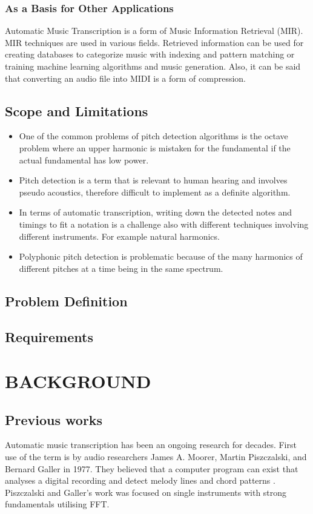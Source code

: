 \documentclass[a4paper,12pt]{report}
\begin{document}
\subsection{As a Basis for Other Applications}
Automatic Music Transcription is a form of Music Information Retrieval (MIR). MIR techniques are used in various fields. Retrieved information can be used for creating databases to categorize music with indexing and pattern matching or training machine learning algorithms and music generation. Also, it can be said that converting an audio file into MIDI is a form of compression.

\section{Scope and Limitations}
\begin{itemize}
\item One of the common problems of pitch detection algorithms \cite{paper:4} is the octave problem where an upper harmonic is mistaken for the fundamental if the actual fundamental has low power. 
\item Pitch detection is a term that is relevant to human hearing and involves pseudo acoustics, therefore difficult to implement as a definite algorithm.
\item In terms of automatic transcription, writing down the detected notes and timings to fit a notation is a challenge also with different techniques involving different instruments. For example natural harmonics.
\item Polyphonic pitch detection is problematic because of the many harmonics of different pitches at a time being in the same spectrum.
\end{itemize} 

\section{Problem Definition}

\section{Requirements}

\chapter{BACKGROUND}
\label{chapter:background}
\section{Previous works}
Automatic music transcription has been an ongoing research for decades. First use of the term  is by audio researchers James A. Moorer, Martin Piszczalski, and Bernard Galler in 1977. They believed that a computer program can exist that analyses a digital recording and detect melody lines and chord patterns \cite{paper:6}. Piszczalski and Galler's work was focused on single instruments with strong fundamentals utilising FFT. 
\end{document}
